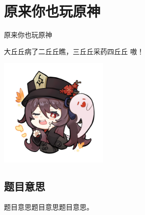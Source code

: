 \def\sectionName{原来你也玩原神}
\section[\TOCName]{\sectionName}



\begin{frame}

\isBeamerMode\relax
    {\Huge \sectionName}\par
\fi




大丘丘病了二丘丘瞧，三丘丘采药四丘丘 嗷！

\begin{center}
\includegraphics[width=0.4\textwidth]{./pic/hutao.png}
\end{center}


\end{frame}

\subsection{题目意思}
\begin{frame} %
题目意思题目意思题目意思。
\end{frame}



